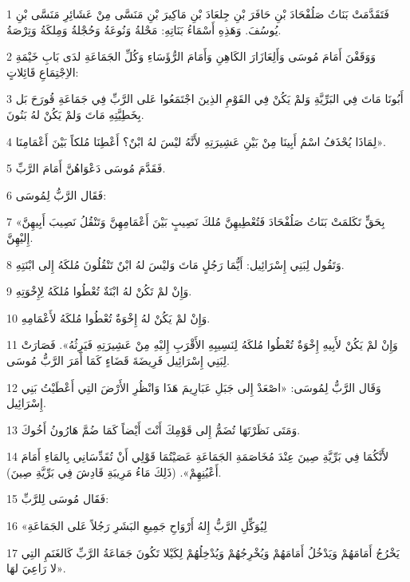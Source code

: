 \par 1 فَتَقَدَّمَتْ بَنَاتُ صَلُفْحَادَ بْنِ حَافَرَ بْنِ جِلعَادَ بْنِ مَاكِيرَ بْنِ مَنَسَّى مِنْ عَشَائِرِ مَنَسَّى بْنِ يُوسُفَ. وَهَذِهِ أَسْمَاءُ بَنَاتِهِ: مَحْلةُ وَنُوعَةُ وَحُجْلةُ وَمِلكَةُ وَتِرْصَةُ.
\par 2 وَوَقَفْنَ أَمَامَ مُوسَى وَأَلِعَازَارَ الكَاهِنِ وَأَمَامَ الرُّؤَسَاءِ وَكُلِّ الجَمَاعَةِ لدَى بَابِ خَيْمَةِ الاِجْتِمَاعِ قَائِلاتٍ:
\par 3 أَبُونَا مَاتَ فِي البَرِّيَّةِ وَلمْ يَكُنْ فِي القَوْمِ الذِينَ اجْتَمَعُوا عَلى الرَّبِّ فِي جَمَاعَةِ قُورَحَ بَل بِخَطِيَّتِهِ مَاتَ وَلمْ يَكُنْ لهُ بَنُونَ.
\par 4 لِمَاذَا يُحْذَفُ اسْمُ أَبِينَا مِنْ بَيْنِ عَشِيرَتِهِ لأَنَّهُ ليْسَ لهُ ابْنٌ؟ أَعْطِنَا مُلكاً بَيْنَ أَعْمَامِنَا».
\par 5 فَقَدَّمَ مُوسَى دَعْوَاهُنَّ أَمَامَ الرَّبِّ.
\par 6 فَقَال الرَّبُّ لِمُوسَى:
\par 7 «بِحَقٍّ تَكَلمَتْ بَنَاتُ صَلُفْحَادَ فَتُعْطِيهِنَّ مُلكَ نَصِيبٍ بَيْنَ أَعْمَامِهِنَّ وَتَنْقُلُ نَصِيبَ أَبِيهِنَّ إِليْهِنَّ.
\par 8 وَتَقُول لِبَنِي إِسْرَائِيل: أَيُّمَا رَجُلٍ مَاتَ وَليْسَ لهُ ابْنٌ تَنْقُلُونَ مُلكَهُ إِلى ابْنَتِهِ.
\par 9 وَإِنْ لمْ تَكُنْ لهُ ابْنَةٌ تُعْطُوا مُلكَهُ لِإِخْوَتِهِ.
\par 10 وَإِنْ لمْ يَكُنْ لهُ إِخْوَةٌ تُعْطُوا مُلكَهُ لأَعْمَامِهِ.
\par 11 وَإِنْ لمْ يَكُنْ لأَبِيهِ إِخْوَةٌ تُعْطُوا مُلكَهُ لِنَسِيبِهِ الأَقْرَبِ إِليْهِ مِنْ عَشِيرَتِهِ فَيَرِثُهُ». فَصَارَتْ لِبَنِي إِسْرَائِيل فَرِيضَةَ قَضَاءٍ كَمَا أَمَرَ الرَّبُّ مُوسَى.
\par 12 وَقَال الرَّبُّ لِمُوسَى: «اصْعَدْ إِلى جَبَلِ عَبَارِيمَ هَذَا وَانْظُرِ الأَرْضَ التِي أَعْطَيْتُ بَنِي إِسْرَائِيل.
\par 13 وَمَتَى نَظَرْتَهَا تُضَمُّ إِلى قَوْمِكَ أَنْتَ أَيْضاً كَمَا ضُمَّ هَارُونُ أَخُوكَ.
\par 14 لأَنَّكُمَا فِي بَرِّيَّةِ صِينَ عِنْدَ مُخَاصَمَةِ الجَمَاعَةِ عَصَيْتُمَا قَوْلِي أَنْ تُقَدِّسَانِي بِالمَاءِ أَمَامَ أَعْيُنِهِمْ». (ذَلِكَ مَاءُ مَرِيبَةِ قَادِشَ فِي بَرِّيَّةِ صِينَ).
\par 15 فَقَال مُوسَى لِلرَّبِّ:
\par 16 «لِيُوَكِّلِ الرَّبُّ إِلهُ أَرْوَاحِ جَمِيعِ البَشَرِ رَجُلاً عَلى الجَمَاعَةِ
\par 17 يَخْرُجُ أَمَامَهُمْ وَيَدْخُلُ أَمَامَهُمْ وَيُخْرِجُهُمْ وَيُدْخِلُهُمْ لِكَيْلا تَكُونَ جَمَاعَةُ الرَّبِّ كَالغَنَمِ التِي لا رَاعِيَ لهَا».
